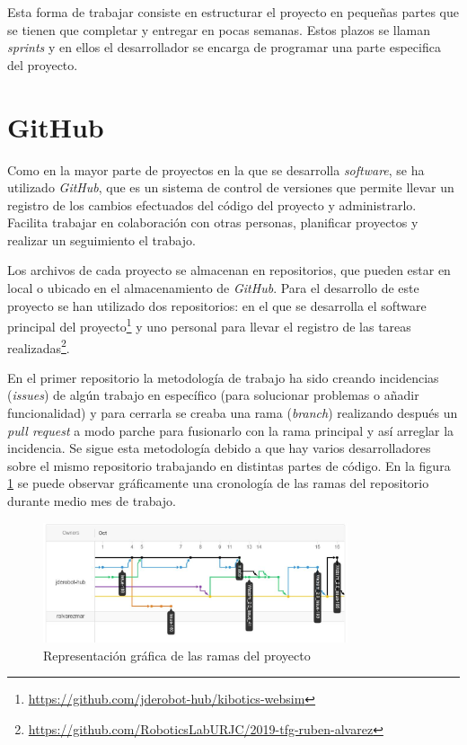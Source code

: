 Esta forma de trabajar consiste en estructurar el proyecto en pequeñas partes que se tienen que completar y entregar en pocas semanas. Estos plazos se llaman \textit{sprints} y en ellos el desarrollador se encarga de programar una parte especifica del proyecto. 
\section{GitHub}
\label{sec:github}
Como en la mayor parte de proyectos en la que se desarrolla \textit{software}, se ha utilizado \textit{GitHub}, que es un sistema de control de versiones que permite llevar un registro de los cambios efectuados del código del proyecto y administrarlo. Facilita trabajar en colaboración con otras personas, planificar proyectos y realizar un seguimiento el trabajo. \newline

Los archivos de cada proyecto se almacenan en repositorios, que pueden estar en local o ubicado en el almacenamiento de \textit{GitHub}. Para el desarrollo de este proyecto se han utilizado dos repositorios:  en el que se desarrolla el software principal del proyecto\footnote{\url{https://github.com/jderobot-hub/kibotics-websim}} y uno personal para llevar el registro de las tareas realizadas\footnote{\url{https://github.com/RoboticsLabURJC/2019-tfg-ruben-alvarez}}.
\newline

En el primer repositorio la metodología de trabajo ha sido creando incidencias (\textit{issues}) de algún trabajo en específico (para solucionar problemas o añadir funcionalidad) y para cerrarla se creaba una rama (\textit{branch}) realizando después un \textit{pull request} a modo parche para fusionarlo con la rama principal y así arreglar la incidencia. Se sigue esta metodología debido a que hay varios desarrolladores sobre el mismo repositorio trabajando en distintas partes de código. En la figura \ref{fig:github} se puede observar gráficamente una cronología de las ramas del repositorio durante medio mes de trabajo.

 \begin{figure}[H]
    \centering
    \includegraphics[width=0.8\textwidth]{img/github.jpg}
    \caption{Representación gráfica de las ramas del proyecto} \label{fig:github}
\end{figure}

